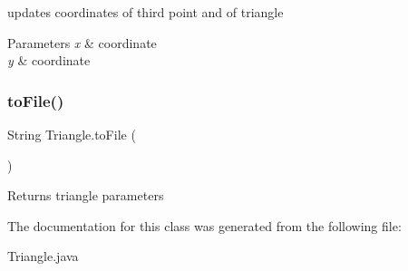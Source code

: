 updates coordinates of third point and of triangle 
\begin{DoxyParams}{Parameters}
{\em x} & coordinate \\
\hline
{\em y} & coordinate \\
\hline
\end{DoxyParams}
\mbox{\label{classTriangle_a3d6a35a828f17de76b170f376fbd1b27}} 
\subsubsection{\texorpdfstring{to\+File()}{toFile()}}
{\footnotesize\ttfamily String Triangle.\+to\+File (\begin{DoxyParamCaption}{ }\end{DoxyParamCaption})\hspace{0.3cm}{\ttfamily [inline]}}

\begin{DoxyReturn}{Returns}
triangle parameters 
\end{DoxyReturn}


The documentation for this class was generated from the following file\+:\begin{DoxyCompactItemize}
\item 
Triangle.\+java\end{DoxyCompactItemize}
